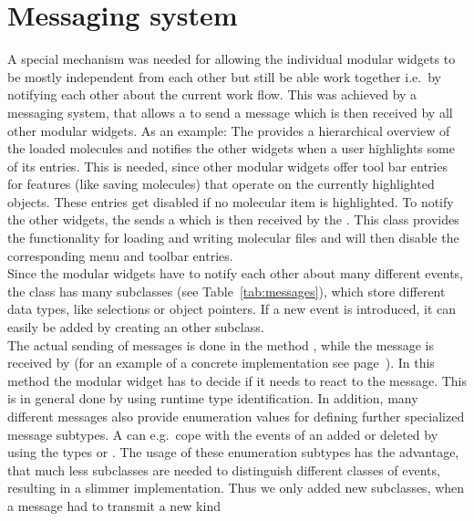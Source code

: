\section{Messaging system} \label{message}
A special mechanism was needed for allowing the individual modular widgets to be mostly 
independent from each other but still be able work together i.e.\ by notifying each other 
about the current work flow. 
This was achieved by a messaging system, that allows a  to send a 
message which is then received by all other modular widgets.
As an example: 
The  provides a hierarchical overview of the loaded molecules
and notifies the other widgets when a user highlights some of its entries. 
This is needed, since other modular widgets offer tool bar entries for features (like 
saving molecules) that operate on the currently highlighted objects. 
These entries get disabled if no molecular item is highlighted.
To notify the other widgets, the  sends a 
which is then received by the .
This class provides the functionality for loading and writing molecular files and will 
then disable the corresponding menu and toolbar entries.\\
Since the modular widgets have to notify each other about many different events, the class
 has many subclasses (see Table~\ref{tab:messages}), which store different data
types, like selections or object pointers. 
If a new event is introduced, it can easily be added by creating an other  
subclass.
\\
The actual sending of messages is done in the method , while 
the message is received by  (for an example of a concrete
implementation see page~\pageref{onNotify}).
In this method the modular widget has to decide if it needs to react to the message. 
This is in general done by using runtime type identification. 
In addition, many different messages also provide enumeration values for defining further
specialized message subtypes. 
A  can e.g.\ cope with the events of an added or deleted 
 by using the types  or 
.
The usage of these enumeration subtypes has the advantage, that much less subclasses
are needed to distinguish different classes of events, resulting in a slimmer implementation.
Thus we only added new  subclasses, when a message had to transmit a new kind 
